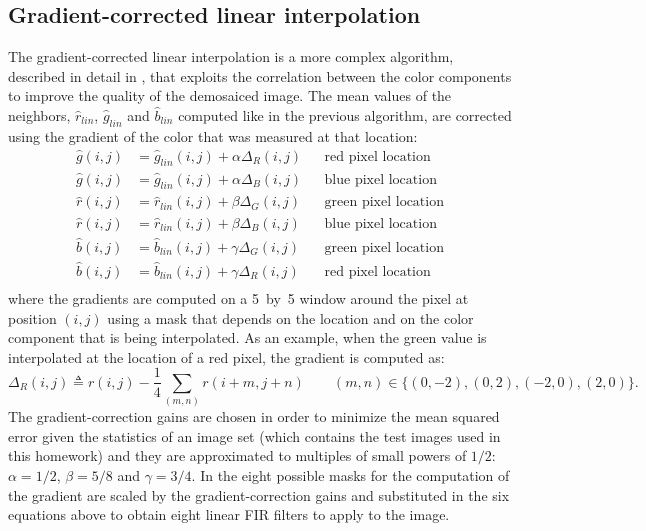 \documentclass[a4paper,oneside]{article}
\begin{document}
\subsection{Gradient-corrected linear interpolation}
The gradient-corrected linear interpolation is a more complex
algorithm, described in detail in \cite{demosaic_gradient}, that
exploits the correlation between the color components to improve the
quality of the demosaiced image.
%
The mean values of the neighbors, $\hat{r}_{lin}$, $\hat{g}_{lin}$ and
$\hat{b}_{lin}$ computed like in the previous algorithm, are corrected
using the gradient of the color that was measured at that location:
\begin{align*}
  \hat{g}(i,j) &= \hat{g}_{lin}(i,j) + \alpha \Delta_R(i,j) & & \text{red pixel location} \\
  \hat{g}(i,j) &= \hat{g}_{lin}(i,j) + \alpha \Delta_B(i,j) & & \text{blue pixel location} \\
  \hat{r}(i,j) &= \hat{r}_{lin}(i,j) + \beta \Delta_G(i,j) & & \text{green pixel location} \\
  \hat{r}(i,j) &= \hat{r}_{lin}(i,j) + \beta \Delta_B(i,j) & & \text{blue pixel location} \\
  \hat{b}(i,j) &= \hat{b}_{lin}(i,j) + \gamma \Delta_G(i,j) & & \text{green pixel location} \\
  \hat{b}(i,j) &= \hat{b}_{lin}(i,j) + \gamma \Delta_R(i,j) & & \text{red pixel location} \\
\end{align*}
where the gradients are computed on a 5~by~5 window around the pixel
at position $(i,j)$ using a mask that depends on the location and on
the color component that is being interpolated. As an example, when
the green value is interpolated at the location of a red pixel, the
gradient is computed as:
\begin{equation*}
  \Delta_R(i,j) \triangleq r(i,j) - \frac{1}{4} \sum_{(m,n)} r(i+m,j+n)
  \qquad (m,n) \in \{(0,-2), (0,2), (-2,0), (2,0)\} .
\end{equation*}
The gradient-correction gains are chosen in order to minimize the mean
squared error given the statistics of an image set (which contains the
test images used in this homework) and they are approximated to
multiples of small powers of $1/2$: $\alpha = 1/2$, $\beta = 5/8$ and
$\gamma = 3/4$. In \cite{demosaic_gradient} the eight possible masks
for the computation of the gradient are scaled by the
gradient-correction gains and substituted in the six equations above
to obtain eight linear FIR filters to apply to the image.
\end{document}
